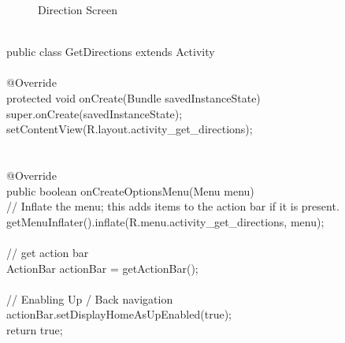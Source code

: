 \documentclass[12pt,a4paper]{article}
\begin{document}
{\begin{figure}[!htb]
\caption{Direction Screen}
\end{figure}
\\
\hspace{0.7 cm}public class GetDirections extends Activity {\\
\\
	@Override\\
	protected void onCreate(Bundle savedInstanceState) {\\
		super.onCreate(savedInstanceState);\\
		setContentView(R.layout.activity_get_directions);\\
	}\\
\\
	@Override\\
	public boolean onCreateOptionsMenu(Menu menu) {\\
		// Inflate the menu; this adds items to the action bar if it is present.\\
		getMenuInflater().inflate(R.menu.activity_get_directions, menu);\\
\\
		// get action bar\\
		ActionBar actionBar = getActionBar();\\
\\
		// Enabling Up / Back navigation\\
		actionBar.setDisplayHomeAsUpEnabled(true);\\
		return true;\\
	}\\
}\\
\\

\newpage
\\
}
\end{document}

